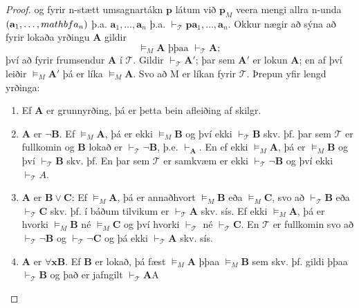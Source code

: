 \documentclass[12pt]{book}
\begin{document}
\begin{setn}
\begin{proof}
    og fyrir n-stætt umsagnartákn $\mathbf{p}$ látum við $\mathbf{p}_M$ veera mengi allra
    n-unda $(\mathbf{a}_1, \dotsc, \\mathbf{a}_n)$ þ.a. 
    \(\mathbf{a}_1, \dotsc, \mathbf{a}_n \)
    þ.a. $\vdash_{\mathcal{T}} \mathbf{p} \mathbf{a}_1, \dotsc, \mathbf{a}_n$.
    Okkur nægir að sýna að fyrir lokaða yrðingu $\mathbf{A}$ gildir
    \[ \models_M \mathbf{A} \text{ þþaa } \vdash_{\mathcal{T}} \mathbf{A}; \]
    því að fyrir frumsendur $\mathbf{A}$ í $\mathcal{T}$. 
    Gildir $\vdash_{\mathcal{T}} \mathbf{A}'$; þar sem $\mathbf{A}'$ er lokun
    $\mathbf{A}$; en af því leiðir $\models_M \mathbf{A}'$ þá er líka $\models_M \mathbf{A}$.
    Svo að M er líkan fyrir $\mathcal{T}$. Þrepun yfir lengd yrðinga:
    \begin{enumerate}[(1)]
    \item Ef $\mathbf{A}$ er grunnyrðing, þá er þetta bein afleiðing af skilgr.
    \item $\mathbf{A}$ er $\lnot \mathbf{B}$. Ef $\models_M \mathbf{A}$, þá er ekki
      $\models_M \mathbf{B}$ og því ekki $\vdash_{\mathcal{T}} \mathbf{B}$ skv. þf.
      þar sem $\mathcal{T}$ er fullkomin og $\mathbf{B}$ lokað er
      $\vdash_{\mathcal{T}} \lnot \mathbf{B}$, þ.e. $\vdash_{\mathbf{A}}$. En ef
      ekki $\models_{M} \mathbf{A}$, þá er $\models_M \mathbf{B}$ og því
      $\vdash_{\mathcal{T}} \mathbf{B}$ skv. þf. En þar sem $\mathcal{T}$ er 
      samkvæm er ekki $\vdash_{\mathcal{T}} \lnot \mathbf{B}$ og því ekki
      $\vdash_{\mathcal{T}} A$.
    \item $\mathbf{A}$ er $\mathbf{B} \vee \mathbf{C}$: Ef $\models_M \mathbf{A}$,
      þá er annaðhvort $\models_M \mathbf{B}$ eða $\models_M \mathbf{C}$,
      svo að $\vdash_{\mathcal{T}} \mathbf{B}$ eða $\vdash_{\mathcal{T}} \mathbf{C}$ skv. þf.
      í báðum tilvikum er $\vdash_{\mathcal{T}} \mathbf{A}$ skv. sís.
      Ef ekki $\models_M \mathbf{A}$, þá er hvorki $\models_M \mathbf{B}$
      né $\models_M \mathbf{C}$ og því hvorki $\vdash_{\mathcal{T}}$ né 
      $\vdash_{\mathcal{T}} \mathbf{C}$.
      En $\mathcal{T}$ er fullkomin svo að $\vdash_{\mathcal{T}} \lnot \mathbf{B}$ 
      og $\vdash_{\mathcal{T}} \lnot \mathbf{C}$ og þá ekki $\vdash_{\mathcal{T}} \mathbf{A}$ skv. sís.

    \item $\mathbf{A}$ er $\forall \mathbf{x} \mathbf{B}$. Ef
      $\mathbf{B}$ er lokað, þá fæst $\models_M \mathbf{A}$ þþaa $\models_M \mathbf{B}$ sem skv.
      þf. gildi þþaa $\vdash_{\mathcal{T}} \mathbf{B}$ og það er jafngilt $\vdash_{\mathcal{T}} \mathbf{A}$A


\end{enumerate}
\end{proof}
\end{setn}
\end{document}
